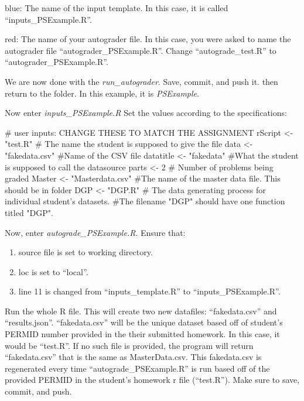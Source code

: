 \documentclass[
]{article}
\newenvironment{Shaded}{}{}
\newcommand{\CommentTok}[1]{\textcolor[rgb]{0.00,0.50,0.00}{#1}}
\newcommand{\DecValTok}[1]{#1}
\newcommand{\NormalTok}[1]{#1}
\newcommand{\StringTok}[1]{\textcolor[rgb]{0.00,0.50,0.50}{#1}}
\begin{document}
blue: The name of the input template. In this case, it is called
``inputs\_PSExample.R''.

red: The name of your autograder file. In this case, you were asked to
name the autograder file ``autograder\_PSExample.R''. Change
``autograde\_test.R'' to ``autograder\_PSExample.R''.

We are now done with the \emph{run\_autograder}. Save, commit, and push
it. then return to the folder. In this example, it is \emph{PSExample}.

Now enter \emph{inputs\_PSExample.R} Set the values according to the
specifications:

\hypertarget{numCode}{%
\label{numCode}}%
\begin{Shaded}
\begin{Highlighting}[numbers=left,,]
\CommentTok{# user inputs: CHANGE THESE TO MATCH THE ASSIGNMENT}
\NormalTok{rScript   <-}\StringTok{ "test.R"} \CommentTok{# The name the student is supposed to give the file}
\NormalTok{data      <-}\StringTok{ "fakedata.csv"} \CommentTok{#Name of the CSV file}
\NormalTok{datatitle <-}\StringTok{ "fakedata"} \CommentTok{#What the student is supposed to call the datasource}
\NormalTok{parts     <-}\StringTok{ }\DecValTok{2} \CommentTok{# Number of problems being graded}
\NormalTok{Master    <-}\StringTok{ "Masterdata.csv"} \CommentTok{#The name of the master data file. This should be in folder}
\NormalTok{DGP       <-}\StringTok{ "DGP.R"} \CommentTok{# The data generating process for individual student's datasets. }
                     \CommentTok{#The filename "DGP" should have one function titled "DGP".}
\end{Highlighting}
\end{Shaded}

Now, enter \emph{autograde\_PSExample.R}. Ensure that:

\begin{enumerate}
\def\labelenumi{\arabic{enumi})}
\item
  source file is set to working directory.
\item
  loc is set to ``local''.
\item
  line 11 is changed from ``inputs\_template.R'' to
  ``inputs\_PSExample.R''.
\end{enumerate}

Run the whole R file. This will create two new datafiles:
``fakedata.csv'' and ``results.json''. ``fakedata.csv'' will be the
unique dataset based off of student's PERMID number provided in the
their submitted homework. In this case, it would be ``test.R''. If no
such file is provided, the program will return ``fakedata.csv'' that is
the same as MasterData.csv. This fakedata.csv is regenerated every time
``autograde\_PSExample.R'' is run based off of the provided PERMID in
the student's homework r file (``test.R''). Make sure to save, commit,
and push.
\end{document}
